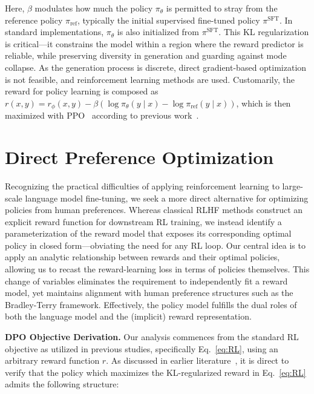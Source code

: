 Here, $\beta$ modulates how much the policy $\pi_\theta$ is permitted to stray from the reference policy $\pi_\text{ref}$, typically the initial supervised fine-tuned policy $\pi^\text{SFT}$. In standard implementations, $\pi_\theta$ is also initialized from $\pi^\text{SFT}$. This KL regularization is critical—it constrains the model within a region where the reward predictor is reliable, while preserving diversity in generation and guarding against mode collapse. As the generation process is discrete, direct gradient-based optimization is not feasible, and reinforcement learning methods are used. Customarily, the reward for policy learning is composed as $r(x, y) = r_{\phi}(x, y) -\beta (\log \pi_{\theta}(y\mid x) - \log \pi_\text{ref}(y\mid x))$, which is then maximized with PPO~\cite{schulman2017proximal} according to previous work~\cite{ziegler2020finetuning, stiennon2022learning, bai2022training, ouyang2022training}.

\section{Direct Preference Optimization}\label{sec:DPO}

Recognizing the practical difficulties of applying reinforcement learning to large-scale language model fine-tuning, we seek a more direct alternative for optimizing policies from human preferences. Whereas classical RLHF methods construct an explicit reward function for downstream RL training, we instead identify a parameterization of the reward model that exposes its corresponding optimal policy in closed form—obviating the need for any RL loop. Our central idea is to apply an analytic relationship between rewards and their optimal policies, allowing us to recast the reward-learning loss in terms of policies themselves. This change of variables eliminates the requirement to independently fit a reward model, yet maintains alignment with human preference structures such as the Bradley-Terry framework. Effectively, the policy model fulfills the dual roles of both the language model and the (implicit) reward representation.

\textbf{DPO Objective Derivation.} Our analysis commences from the standard RL objective as utilized in previous studies, specifically Eq.~\ref{eq:RL}, using an arbitrary reward function $r$. As discussed in earlier literature~\citep{peters2007reinforcement, peng2019advantage, korbak2022reinforcement, go2023aligning}, it is direct to verify that the policy which maximizes the KL-regularized reward in Eq.~\ref{eq:RL} admits the following structure:

